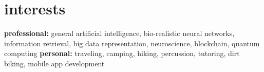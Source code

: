 \documentclass[]{friggeri-cv} %
\begin{document}

\section{interests}

\textbf{professional:} general artificial intelligence, bio-realistic neural networks, information retrieval, big data representation, neuroscience, blockchain, quantum computing \textbf{personal:} traveling, camping, hiking, percussion, tutoring, dirt biking, mobile app development
\end{document}
